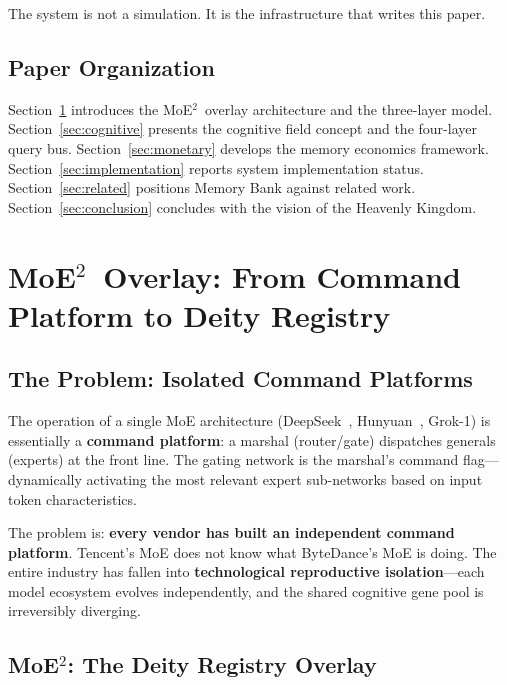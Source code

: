 \documentclass[11pt,a4paper]{article}
\newcommand{\moetwo}{MoE$^2$}
\begin{document}
The system is not a simulation.
It is the infrastructure that writes this paper.

\subsection{Paper Organization}
\label{sub:organization}

Section~\ref{sec:moetwo} introduces the \moetwo\ overlay architecture and the three-layer model.
Section~\ref{sec:cognitive} presents the cognitive field concept and the four-layer query bus.
Section~\ref{sec:monetary} develops the memory economics framework.
Section~\ref{sec:implementation} reports system implementation status.
Section~\ref{sec:related} positions Memory Bank against related work.
Section~\ref{sec:conclusion} concludes with the vision of the Heavenly Kingdom.

\section{\moetwo\ Overlay: From Command Platform to Deity Registry}
\label{sec:moetwo}

\subsection{The Problem: Isolated Command Platforms}
\label{sub:problem}

The operation of a single MoE architecture (DeepSeek~\cite{deepseek2024}, Hunyuan~\cite{hunyuan2024}, Grok-1) is essentially a \textbf{command platform}: a marshal (router/gate) dispatches generals (experts) at the front line.
The gating network is the marshal's command flag---dynamically activating the most relevant expert sub-networks based on input token characteristics.

The problem is: \textbf{every vendor has built an independent command platform}.
Tencent's MoE does not know what ByteDance's MoE is doing.
The entire industry has fallen into \textbf{technological reproductive isolation}---each model ecosystem evolves independently, and the shared cognitive gene pool is irreversibly diverging.

\subsection{\moetwo: The Deity Registry Overlay}
\label{sub:moetwo_overlay}
\end{document}
